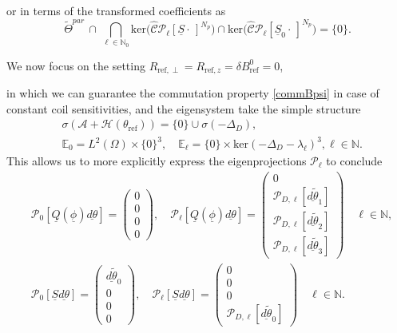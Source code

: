 \documentclass[12pt]{article}
\newcommand\skipgradient[1]{}
\newcommand\uld[1]{\underline{d#1}}
\newcommand\calA{\mathcal{A}}
\newcommand\HH{\mathcal{H}}
\newcommand\Proj{\mathcal{P}}
\newcommand\ulQ{\underline{Q}}
\newcommand\Ncont{N_p}
\begin{document}
or in terms of the transformed coefficients as
\begin{equation*}%
\tilde{\Theta}^{par}\,\cap\,\bigcap_{\ell\in\mathbb{N}_0} 
\text{ker}\bigl(\hat{\mathcal{C}} \Proj_\ell [\underline{S} \cdot\,]^{\Ncont}\bigr)\cap 
\text{ker}\bigl(\hat{\mathcal{C}} \Proj_\ell [\underline{S}_0 \cdot\,]^{\Ncont}\bigr)
=\{0\}.
\end{equation*}

We now focus on the setting $R_{\text{ref},\perp}=R_{\text{ref},z}=\delta B^0_{\text{ref}}=0$, 
\skipgradient{$\vec{g}=0$,} 
in which we can guarantee the commutation property \eqref{commBpsi} in case of constant coil sensitivities, and the eigensystem take the simple structure
\[
\begin{aligned}
&\sigma(\calA+\HH(\theta_{\text{ref}}))=\{0\}\cup\sigma(-\Delta_D), \\
&\mathbb{E}_0=L^2(\Omega)\times\{0\}^3, \quad 
\mathbb{E}_\ell=\{0\}\times\text{ker}(-\Delta_D-\lambda_\ell)^3, \ell\in\mathbb{N}.
\end{aligned}
\]
This allows us to more explicitly express the eigenprojections $\Proj_\ell$ to conclude
\[
\begin{aligned}
&\Proj_0 [\ulQ(\underline{\phi})\uld{\theta}]=
\begin{pmatrix}
0\\
0\\
0\\
0
\end{pmatrix}, \quad 
\Proj_\ell [\ulQ(\underline{\phi})\uld{\theta}]=
\begin{pmatrix}
0\\
\Proj_{D,\ell}[\uld{\tilde{\theta}}_1]\\
\Proj_{D,\ell}[\uld{\tilde{\theta}}_2]\\
\Proj_{D,\ell}[\uld{\tilde{\theta}}_3]
\end{pmatrix}
\quad \ell\in \mathbb{N},\\
&\Proj_0 [\underline{S} \uld\theta] = 
\begin{pmatrix}
\uld{\tilde{\theta}}_0\\
0\\
0\\
0
\end{pmatrix}, \quad
\Proj_\ell [\underline{S} \uld\theta] = 
\begin{pmatrix}
0\\
0\\
0\\
\Proj_{D,\ell}[\uld{\tilde{\theta}}_0]
\end{pmatrix}
\quad \ell\in \mathbb{N}.
\end{aligned}
\]
\end{document}
